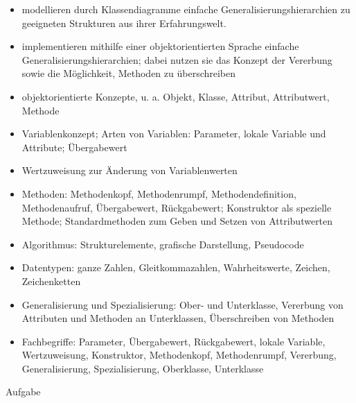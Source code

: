 \documentclass{lehramt-informatik-aufgabe}
\begin{document}
\begin{liKasten}
\begin{itemize}
\item modellieren durch Klassendiagramme einfache
Generalisierungshierarchien zu geeigneten Strukturen aus ihrer
Erfahrungswelt.

\item implementieren mithilfe einer objektorientierten Sprache einfache
Generalisierungshierarchien; dabei nutzen sie das Konzept der Vererbung
sowie die Möglichkeit, Methoden zu überschreiben
\end{itemize}


\begin{itemize}
\item objektorientierte Konzepte, u. a. Objekt, Klasse, Attribut,
Attributwert, Methode

\item Variablenkonzept; Arten von Variablen: Parameter, lokale Variable
und Attribute; Übergabewert

\item Wertzuweisung zur Änderung von Variablenwerten

\item Methoden: Methodenkopf, Methodenrumpf, Methodendefinition,
Methodenaufruf, Übergabewert, Rückgabewert; Konstruktor als spezielle
Methode; Standardmethoden zum Geben und Setzen von Attributwerten

\item Algorithmus: Strukturelemente, grafische Darstellung, Pseudocode

\item Datentypen: ganze Zahlen, Gleitkommazahlen, Wahrheitswerte,
Zeichen, Zeichenketten

\item Generalisierung und Spezialisierung: Ober- und Unterklasse,
Vererbung von Attributen und Methoden an Unterklassen, Überschreiben von
Methoden

\item Fachbegriffe: Parameter, Übergabewert, Rückgabewert, lokale
Variable, Wertzuweisung, Konstruktor, Methodenkopf, Methodenrumpf,
Vererbung, Generalisierung, Spezialisierung, Oberklasse, Unterklasse
\end{itemize}

\end{liKasten}
Aufgabe
\end{document}

